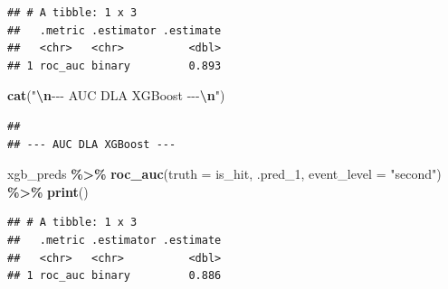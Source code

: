 \documentclass[
]{article}
\newenvironment{Shaded}{\begin{snugshade}}{\end{snugshade}}
\newcommand{\AttributeTok}[1]{\textcolor[rgb]{0.13,0.29,0.53}{#1}}
\newcommand{\FunctionTok}[1]{\textcolor[rgb]{0.13,0.29,0.53}{\textbf{#1}}}
\newcommand{\NormalTok}[1]{#1}
\newcommand{\SpecialCharTok}[1]{\textcolor[rgb]{0.81,0.36,0.00}{\textbf{#1}}}
\newcommand{\StringTok}[1]{\textcolor[rgb]{0.31,0.60,0.02}{#1}}
\begin{document}
\begin{verbatim}
## # A tibble: 1 x 3
##   .metric .estimator .estimate
##   <chr>   <chr>          <dbl>
## 1 roc_auc binary         0.893
\end{verbatim}

\begin{Shaded}
\begin{Highlighting}[]
\FunctionTok{cat}\NormalTok{(}\StringTok{"}\SpecialCharTok{\textbackslash{}n}\StringTok{{-}{-}{-} AUC DLA XGBoost {-}{-}{-}}\SpecialCharTok{\textbackslash{}n}\StringTok{"}\NormalTok{)}
\end{Highlighting}
\end{Shaded}

\begin{verbatim}
## 
## --- AUC DLA XGBoost ---
\end{verbatim}

\begin{Shaded}
\begin{Highlighting}[]
\NormalTok{xgb\_preds }\SpecialCharTok{\%\textgreater{}\%} \FunctionTok{roc\_auc}\NormalTok{(}\AttributeTok{truth =}\NormalTok{ is\_hit, .pred\_1, }\AttributeTok{event\_level =} \StringTok{"second"}\NormalTok{) }\SpecialCharTok{\%\textgreater{}\%} \FunctionTok{print}\NormalTok{()}
\end{Highlighting}
\end{Shaded}

\begin{verbatim}
## # A tibble: 1 x 3
##   .metric .estimator .estimate
##   <chr>   <chr>          <dbl>
## 1 roc_auc binary         0.886
\end{verbatim}
\end{document}
